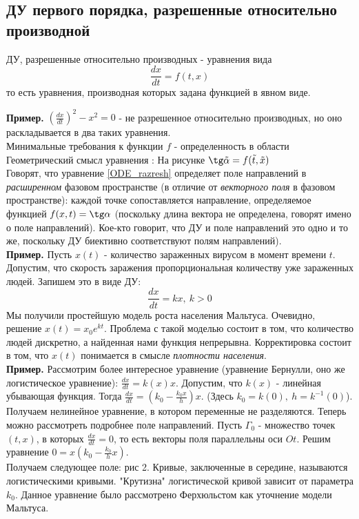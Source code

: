 \subsection{ДУ первого порядка, разрешенные относительно производной}
\begin{defin}
ДУ, разрешенные относительно производных - уравнения вида 
\begin{equation}
    \frac{dx}{dt}=f(t,x) \label{ODE_razresh}
\end{equation}
то есть уравнения, производная которых задана функцией в явном виде.
\end{defin}
\textbf{Пример.} $(\frac{dx}{dt})^2-x^2=0$ - не разрешенное
относительно производных, но оно раскладывается в два таких уравнения. \\
Минимальные требования к функции $f$ - определенность в области\\
Геометрический смысл уравнения \label{ODE_razresh}: 
На рисунке $\tg\tilde\alpha=f(\tilde{t},\tilde x)$\\
Говорят, что уравнение \ref{ODE_razresh} определяет поле направлений в 
\textit{расширенном} фазовом пространстве (в отличие от \textit{векторного
поля} в фазовом пространстве):
каждой точке сопоставляется направление, определяемое функцией
$f(x,t)=\tg\alpha$ (поскольку длина вектора не определена, говорят имено о 
поле направлений). Кое-кто говорит, что ДУ и поле направлений это одно и то 
же, поскольку ДУ биективно соответствуют полям направлений).\\
\textbf{Пример.} Пусть $x(t)$ - количество зараженных вирусом
в момент времени $t$. Допустим, что скорость заражения пропорциональная
количеству уже зараженных людей. Запишем это в виде ДУ:
$$\frac{dx}{dt}=kx,~k>0$$
Мы получили простейшую модель роста населения Мальтуса. Очевидно, решение
$x(t)=x_0e^{kt}$. Проблема с такой моделью состоит в том, что количество 
людей дискретно, а найденная нами функция непрерывна. Корректировка состоит
в том, что $x(t)$ понимается в смысле \textit{плотности населения}. \\
\textbf{Пример.} Рассмотрим более интересное уравнение (уравнение Бернулли,
оно же логистическое уравнение): 
$\frac{dx}{dt}=k(x)x$. Допустим, что $k(x)$ - линейная убывающая функция. 
Тогда $\frac{dx}{dt}=(k_0-\frac{k_0x}{h})x$. (Здесь $k_0=k(0),~h=k^{-1}(0)$).
Получаем нелинейное уравнение, в котором переменные не разделяются. Теперь
можно рассмотреть подробнее поле направлений. Пусть $\Gamma_0$ - множество
точек  $(t,x)$, в которых  $\frac{dx}{dt}=0$, то есть векторы поля 
параллельны оси $Ot$. Решим уравнение  $0=x(k_0-\frac{k_0}{h}x)$. \\
Получаем следующее поле: рис 2. Кривые, заключенные в середине, называются
логистическими кривыми. "Крутизна" логистической кривой зависит от параметра 
$k_0$. Данное уравнение было рассмотрено Ферхюльстом как уточнение модели
Мальтуса. 


